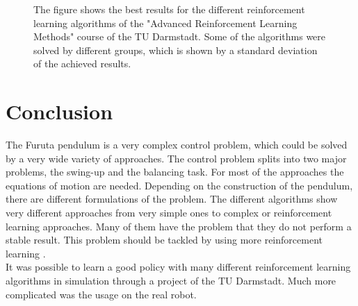  \begin{figure}[h]
 	\centering
	\scalebox{.4}{}
	\caption{The figure shows the best results for the different reinforcement 
	learning algorithms of the "Advanced Reinforcement Learning Methods" 
	course 
	of the TU Darmstadt. Some of the algorithms were solved by different 
	groups, which is shown by a standard deviation of the achieved results.}
	\label{fig:rewards}
\end{figure}



\section{Conclusion}
The Furuta pendulum is a very complex control problem, which could be solved by 
a very wide variety of approaches. The control problem splits into two major 
problems, the swing-up and the balancing task. For most of the approaches the 
equations of motion are needed. Depending on the construction of the pendulum, 
there are different formulations of the problem. The different algorithms show 
very different approaches from very simple ones to complex or reinforcement 
learning approaches. Many of them have the problem that they do not perform a 
stable result. This problem should be tackled by using more 
reinforcement learning \citep{wang2004minimum}.\\
It was possible to learn a good policy with many different reinforcement 
learning algorithms in simulation through a project of the TU Darmstadt. Much 
more complicated was the usage on the real robot.







